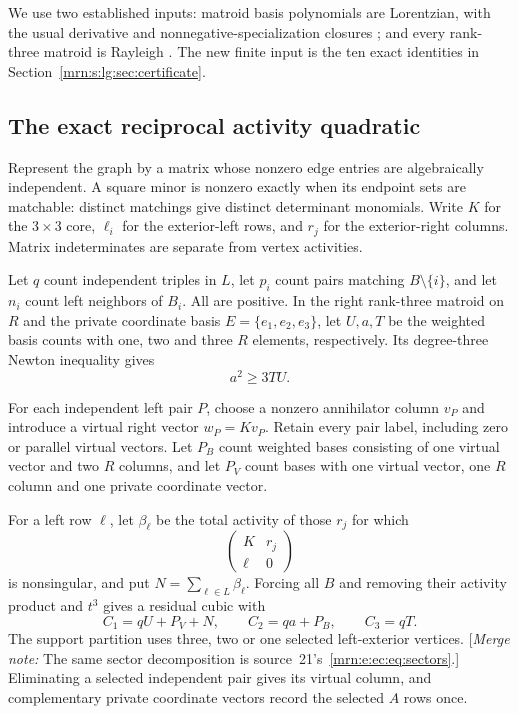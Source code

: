 \documentclass[11pt,a4paper]{article}
\theoremstyle{remark}\newtheorem{remark}[theorem]{Remark}
\newcommand{\mnote}[1]{[\textit{Merge note:} #1]}
\begin{document}
We use two established inputs: matroid basis polynomials are Lorentzian, with the usual derivative and nonnegative-specialization closures \cite{b:BH}; and every rank-three matroid is Rayleigh \cite{b:Wagner}. The new finite input is the ten exact identities in Section~\ref{mrn:s:lg:sec:certificate}.

\subsection{The exact reciprocal activity quadratic}
Represent the graph by a matrix whose nonzero edge entries are algebraically independent. A square minor is nonzero exactly when its endpoint sets are matchable: distinct matchings give distinct determinant monomials. Write $K$ for the $3\times3$ core, $\ell_i$ for the exterior-left rows, and $r_j$ for the exterior-right columns. Matrix indeterminates are separate from vertex activities.

Let $q$ count independent triples in $L$, let $p_i$ count pairs matching $B\setminus\{i\}$, and let $n_i$ count left neighbors of $B_i$. All are positive. In the right rank-three matroid on $R$ and the private coordinate basis $E=\{e_1,e_2,e_3\}$, let $U,a,T$ be the weighted basis counts with one, two and three $R$ elements, respectively. Its degree-three Newton inequality gives
\begin{equation}\label{mrn:s:lg:eq:rightnewton}
 a^2\ge3TU.
\end{equation}

For each independent left pair $P$, choose a nonzero annihilator column $v_P$ and introduce a virtual right vector $w_P=Kv_P$. Retain every pair label, including zero or parallel virtual vectors. Let $P_B$ count weighted bases consisting of one virtual vector and two $R$ columns, and let $P_V$ count bases with one virtual vector, one $R$ column and one private coordinate vector.

For a left row $\ell$, let $\beta_\ell$ be the total activity of those $r_j$ for which
\begin{equation}\label{mrn:s:lg:eq:block}
 \begin{pmatrix}K&r_j\\ \ell&0\end{pmatrix}
\end{equation}
is nonsingular, and put $N=\sum_{\ell\in L}\beta_\ell$.
Forcing all $B$ and removing their activity product and $t^3$ gives a residual cubic with
\begin{equation}\label{mrn:s:lg:eq:C}
 C_1=qU+P_V+N,\qquad C_2=qa+P_B,\qquad C_3=qT.
\end{equation}
The support partition uses three, two or one selected left-exterior vertices. \mnote{The same sector decomposition is source~21's~\eqref{mrn:e:ec:eq:sectors}.} Eliminating a selected independent pair gives its virtual column, and complementary private coordinate vectors record the selected $A$ rows once.
\end{document}

